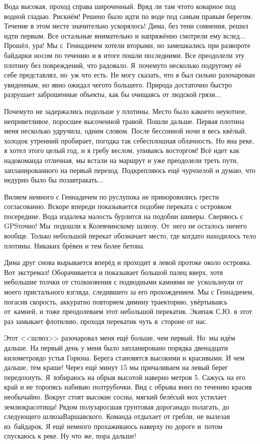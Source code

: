 Вода высокая, проход справа широченный. Вряд ли там что\sdash то коварное под водной гладью. Рискнём! Решено было идти по воде под самым правым берегом. Течение в этом месте значительно ускорялось! Дима, без тени сомнения, решил идти первым. Все остальные внимательно и напряжённо смотрели ему вслед$\ldots$ Прошёл, ура! Мы с~Геннадичем хотели вторыми, но замешкались при развороте байдарки носом по течению и в итоге пошли последними. Все преодолели эту плотину без повреждений, что радовало. Я~почему\sdash то несколько по\sdash другому её себе представлял, но~уж что есть. Не могу сказать, что я был сильно разочарован увиденным, но явно ожидал чего\sdash то большего. Природа достаточно быстро разрушает заброшенные объекты, как бы очищаясь от людской грязи$\ldots$

Почему\sdash то не задержались подольше у плотины. Место было какое\sdash то неуютное, неприветливое, поросшее высоченной травой. Пошли дальше. Первая плотина меня несколько удручила, одним словом. После бессонной ночи я весь квёлый, холодок утренний пробирает, погодка так себе\mdash сплошная облачность. Но я\mdash на реке, я хотел этого целый год, и я гребу веслом, упиваясь восторгом! Всё идет как надо\mdash команда отличная, мы встали на маршрут и уже преодолели треть пути, запланированного на первый переход. Подкрепляюсь ещё чурчхелой и думаю, что недурно было бы позавтракать$\ldots$ 

Виляем немного с Геннадичем по руслу\mdash пока не приноровились грести согласованно. Вскоре впереди показывается подобие переката с островком посередине. Вода издалека малость бурлится на подобии шиверы. Сверяюсь с GPS\mdash точно! Мы~подошли к Колевчинскому шлюзу. От~него не осталось ничего вообще. Только небольшой перекат обозначает место, где когда\sdash то находилось тело плотины. Никаких брёвен и тем более бетона. 

Дима друг снова вырывается вперёд и проходит в левой протоке около островка. Вот экстремал! Оборачивается и показывает большой палец вверх, хотя небольшие толчки от столкновения с подводными камнями не~ускользнули от моего пристального взгляда, следившего за его прохождением. Мы с Геннадичем, погасив скорость, аккуратно повторяем димину траекторию, увёртываясь от~камней, и тоже преодолеваем этот небольшой перекатик. Экипаж С.Ю. в этот раз замыкает флотилию, проходя перекатик чуть в~стороне от нас.

Этот <<шлюз>> разочаровал меня ещё больше, чем первый. Но~мы идём дальше. На первый день у меня было запланировано порядка двенадцати километров\mdash до устья Горюна. Берега становятся высокими и красивыми. И чем дальше, тем краше! Через ещё минут 15\thinspace\nbdash{} мы причаливаем на левый берег передохнуть. Я~взбираюсь на обрыв высотой наверно метров 5. Сажусь на его край и не торопясь набиваю полтрубочки. Вид с обрыва вниз по течению красив необычайно. Вокруг стоят высокие сосны, мягкий белёсый мох устилает землю\mdash красотища! Рядом полузаросшая грунтовая дорога\mdash надо полагать, до следующего шлюза\mdash Варшавского. Команда отдыхает от гребли, не вылезая из~байдарок. Я ещё немного прохаживаюсь наверху по дороге и~потом спускаюсь к реке. Ну что же, пора дальше! 

